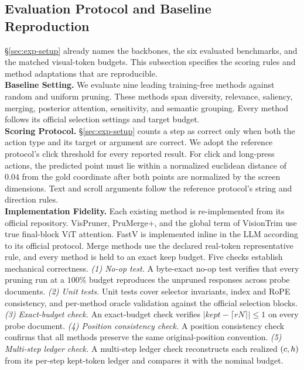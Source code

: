 \subsection{Evaluation Protocol and Baseline Reproduction}
\label{app:protocol}
\S\ref{sec:exp-setup} already names the backbones, the six evaluated benchmarks, and the matched visual-token budgets.
%
This subsection specifies the scoring rules and method adaptations that are reproducible.
\\
\noindent\textbf{Baseline Setting.}
We evaluate nine leading training-free methods against random and uniform pruning.
%
These methods span diversity, relevance, saliency, merging, posterior attention, sensitivity, and semantic grouping.
%
Every method follows its official selection settings and target budget.
\\
\noindent\textbf{Scoring Protocol.}
\S\ref{sec:exp-setup} counts a step as correct only when both the action type and its target or argument are correct.
%
We adopt the reference protocol's click threshold for every reported result.
%
For click and long-press actions, the predicted point must lie within a normalized euclidean distance of $0.04$ from the gold coordinate after both points are normalized by the screen dimensions.
%
Text and scroll arguments follow the reference protocol's string and direction rules.
\\
\noindent\textbf{Implementation Fidelity.}
Each existing method is re-implemented from its official repository.
%
VisPruner, PruMerge+, and the global term of VisionTrim use true final-block ViT attention.
%
FastV is implemented inline in the LLM according to its official protocol.
%
Merge methods use the declared real-token representative rule, and every method is held to an exact keep budget.
%
Five checks establish mechanical correctness.
%
\noindent\textit{(1) No-op test.}
A byte-exact no-op test verifies that every pruning run at a $100\%$ budget reproduces the unpruned responses across probe documents.
%
\noindent\textit{(2) Unit tests.}
Unit tests cover selector invariants, index and RoPE consistency, and per-method oracle validation against the official selection blocks.
%
\noindent\textit{(3) Exact-budget check.}
An exact-budget check verifies $|kept-\lceil rN\rceil|\leq1$ on every probe document.
%
\noindent\textit{(4) Position consistency check.}
A position consistency check confirms that all methods preserve the same original-position convention.
%
\noindent\textit{(5) Multi-step ledger check.}
A multi-step ledger check reconstructs each realized $(c,h)$ from its per-step kept-token ledger and compares it with the nominal budget.
